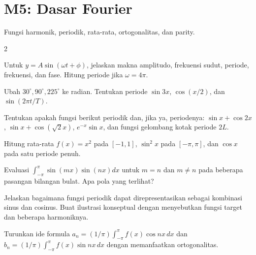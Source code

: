 \documentclass[10pt,a4paper]{article}
\newcommand{\level}[1]{\colorbox{levelbg}{\scriptsize\strut #1}}
\newcommand{\src}[1]{\colorbox{sourcebg}{\scriptsize\strut #1}}
\begin{document}
\section*{M5: Dasar Fourier}
{\color{iteraGray}\small Fungsi harmonik, periodik, rata-rata, ortogonalitas, dan parity.}\par\vspace{1mm}
\begin{multicols}{2}
\begin{qbox}[title={M5.1: Fungsi harmonik\hfill \level{L1}\;\src{Var}}]
\small Untuk $y=A\sin(\omega t+\phi)$, jelaskan makna amplitudo, frekuensi sudut, periode, frekuensi, dan fase. Hitung periode jika $\omega=4\pi$.
\end{qbox}
\begin{qbox}[title={M5.2: Radian dan periodisitas\hfill \level{L1}\;\src{Var}}]
\small Ubah $30^\circ,90^\circ,225^\circ$ ke radian. Tentukan periode $\sin 3x$, $\cos(x/2)$, dan $\sin(2\pi t/T)$.
\end{qbox}
\begin{qbox}[title={M5.3: Fungsi periodik atau bukan\hfill \level{L2}\;\src{Var}}]
\small Tentukan apakah fungsi berikut periodik dan, jika ya, periodenya: $\sin x+\cos 2x$, $\sin x+\cos(\sqrt2x)$, $e^{-x}\sin x$, dan fungsi gelombang kotak periode $2L$.
\end{qbox}
\begin{qbox}[title={M5.4: Rata-rata fungsi\hfill \level{L2}\;\src{Var}}]
\small Hitung rata-rata $f(x)=x^2$ pada $[-1,1]$, $\sin^2 x$ pada $[-\pi,\pi]$, dan $\cos x$ pada satu periode penuh.
\end{qbox}
\begin{qbox}[title={M5.5: Ortogonalitas\hfill \level{L2}\;\src{Var}}]
\small Evaluasi $\int_{-\pi}^{\pi}\sin(mx)\sin(nx)dx$ untuk $m=n$ dan $m\ne n$ pada beberapa pasangan bilangan bulat. Apa pola yang terlihat?
\end{qbox}
\begin{qbox}[title={M5.6: Representasi sinus-kosinus\hfill \level{L1}\;\src{PR}}]
\small Jelaskan bagaimana fungsi periodik dapat direpresentasikan sebagai kombinasi sinus dan cosinus. Buat ilustrasi konseptual dengan menyebutkan fungsi target dan beberapa harmoniknya.
\end{qbox}
\begin{qbox}[title={M5.7: Asal koefisien Fourier\hfill \level{L3}\;\src{PR}}]
\small Turunkan ide formula $a_n=(1/\pi)\int_{-\pi}^{\pi}f(x)\cos nx\,dx$ dan $b_n=(1/\pi)\int_{-\pi}^{\pi}f(x)\sin nx\,dx$ dengan memanfaatkan ortogonalitas.

\end{qbox}
\end{multicols}
\end{document}
